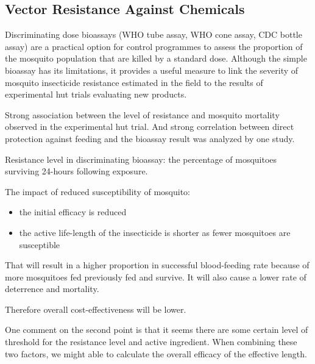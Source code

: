 \documentclass[a4paper, 12pt, twoside]{article}
\begin{document}
\subsection{Vector Resistance Against Chemicals}

Discriminating dose bioassays (WHO tube assay, WHO cone assay, CDC bottle assay) are a practical option for control programmes to assess the proportion of the mosquito population that are killed by a standard dose.
Although the simple bioassay has its limitations, it provides a useful measure to link the severity of mosquito insecticide resistance estimated in the field to the results of experimental hut trials evaluating new products.

Strong association between the level of resistance and mosquito mortality observed in the experimental hut trial\cite{Sherrard-Smith2018b}.
And strong correlation between direct protection against feeding and the bioassay result was analyzed by one study\cite{Briet2013}.

Resistance level in discriminating bioassay: the percentage of mosquitoes surviving 24-hours following exposure.

The impact of reduced susceptibility of mosquito:
\begin{itemize}
	\item the initial efficacy is reduced
	\item the active life-length of the insecticide is shorter as fewer mosquitoes are susceptible
\end{itemize}


That will result in a higher proportion in successful blood-feeding rate because of more mosquitoes fed previously fed and survive.
It will also cause a lower rate of deterrence and mortality.

Therefore overall cost-effectiveness will be lower.

One comment on the second point is that it seems there are some certain level of threshold for the resistance level and active ingredient. When combining these two factors, we might able to calculate the overall efficacy of the effective length.
\end{document}
